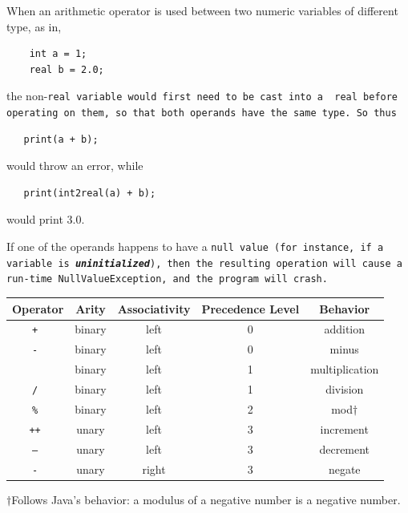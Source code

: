 \documentclass{report}
\begin{document}
When an arithmetic operator is used between two numeric variables of different
type, as in,

\begin{verbatim}
    int a = 1;
    real b = 2.0;
\end{verbatim}

\noindent the non-\tt real \rm variable would first need to be cast into a \tt
real \rm before operating on them, so that both operands have the
same type. So thus

\begin{verbatim}
   print(a + b);
\end{verbatim}

would throw an error, while

\begin{verbatim}
   print(int2real(a) + b);
\end{verbatim}

would print 3.0.

If one of the operands happens to have a \tt null \rm value (for instance, if a
variable is \textbf{\emph{uninitialized}}), then the resulting operation will
cause a run-time \tt NullValueException\rm, and the program will crash.

\begin{center}
\begin{tabular}{|c|c|c|c|c|}

\hline \textbf{Operator} & \textbf{Arity} & \textbf{Associativity} &
\textbf{Precedence Level} & \textbf{Behavior} \\ \hline
\tt + \rm & binary & left & 0 & addition \\ \hline
\tt - \rm & binary & left & 0 & minus \\ \hline
\tt * \rm & binary & left & 1 & multiplication \\ \hline
\tt / \rm & binary & left & 1 & division \\ \hline
\tt \% \rm & binary & left & 2 & mod$\dagger$
\\ 
\hline
\tt ++ \rm & unary & left & 3 & increment \\ \hline
\tt -- \rm & unary & left & 3 & decrement \\ \hline
\tt - \rm & unary & right & 3 & negate \\ \hline
\end{tabular}
\end{center}

$\dagger$Follows Java's behavior: a modulus of a negative number is a negative
number.
\end{document}
